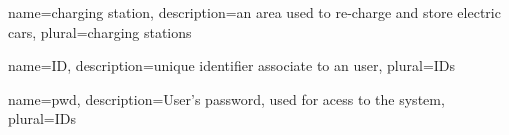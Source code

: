 {
  name={charging station},
  description={an area used to re-charge and store electric cars},
  plural={charging stations}
}

{
  name={ID},
  description={unique identifier associate to an user},
  plural={IDs}
}

{
  name={pwd},
  description={User's password, used for acess to the system},
  plural={IDs}
}

